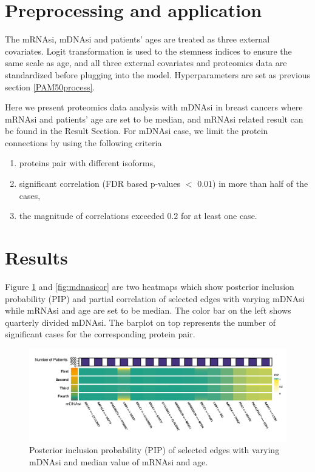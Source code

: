 \documentclass[
]{book}
\begin{document}
\hypertarget{StemnessBCprocess}{%
\section{Preprocessing and application}\label{StemnessBCprocess}}

The mRNAsi, mDNAsi and patients' ages are treated as three external covariates. Logit transformation is used to the stemness indices to ensure the same scale as age, and all three external covariates and proteomics data are standardized before plugging into the model. Hyperparameters are set as previous section \ref{PAM50process}.

Here we present proteomics data analysis with mDNAsi in breast cancers where mRNAsi and patients' age are set to be median, and mRNAsi related result can be found in the Result Section. For mDNAsi case, we limit the protein connections by using the following criteria

\begin{enumerate}
\def\labelenumi{(\arabic{enumi})}
\item
  proteins pair with different isoforms,
\item
  significant correlation (FDR based p-values \(<\) \(0.01\)) in more than half of the cases,
\item
  the magnitude of correlations exceeded \(0.2\) for at least one case.
\end{enumerate}

\hypertarget{StemnessBCresult}{%
\section{Results}\label{StemnessBCresult}}

Figure \ref{fig:mdnasipip} and \ref{fig:mdnasicor} are two heatmaps which show posterior inclusion probability (PIP) and partial correlation of selected edges with varying mDNAsi while mRNAsi and age are set to be median. The color bar on the left shows quarterly divided mDNAsi. The barplot on top represents the number of significant cases for the corresponding protein pair.

\begin{figure}

{\centering \includegraphics[width=0.9\linewidth]{images/mdna_pip} 

}

\caption{Posterior inclusion probability (PIP) of selected edges with varying mDNAsi and median value of mRNAsi and age.}\label{fig:mdnasipip}
\end{figure}
\end{document}
